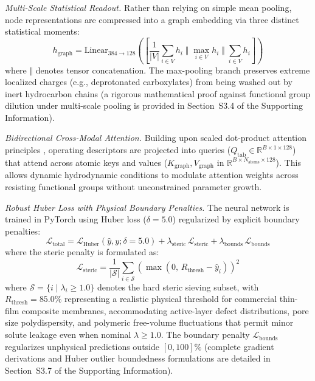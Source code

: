 \documentclass[11pt]{article}
\begin{document}
\textit{Multi-Scale Statistical Readout.} Rather than relying on simple mean pooling, node representations are compressed into a graph embedding via three distinct statistical moments:
\begin{equation}
h_{\mathrm{graph}} = \mathrm{Linear}_{384 \to 128} \left( \left[ \frac{1}{|V|}\sum_{i \in V} h_i \; \Big\Vert \; \max_{i \in V} h_i \; \Big\Vert \; \sum_{i \in V} h_i \right] \right)
\label{eq:readout}
\end{equation}
where $\Vert$ denotes tensor concatenation. The max-pooling branch preserves extreme localized charges (e.g., deprotonated carboxylates) from being washed out by inert hydrocarbon chains (a rigorous mathematical proof against functional group dilution under multi-scale pooling is provided in Section~S3.4 of the Supporting Information).

\textit{Bidirectional Cross-Modal Attention.} Building upon scaled dot-product attention principles \cite{vaswani2017}, operating descriptors are projected into queries ($Q_{\mathrm{tab}} \in \mathbb{R}^{B \times 1 \times 128}$) that attend across atomic keys and values ($K_{\mathrm{graph}}, V_{\mathrm{graph}}$ in $\mathbb{R}^{B \times N_{\mathrm{atoms}} \times 128}$). This allows dynamic hydrodynamic conditions to modulate attention weights across resisting functional groups without unconstrained parameter growth.

\textit{Robust Huber Loss with Physical Boundary Penalties.} The neural network is trained in PyTorch \cite{paszke2019} using Huber loss ($\delta = 5.0$) regularized by explicit boundary penalties:
\begin{equation}
\mathcal{L}_{\mathrm{total}} = \mathcal{L}_{\mathrm{Huber}}(\hat{y}, y; \delta = 5.0) + \lambda_{\mathrm{steric}}\,\mathcal{L}_{\mathrm{steric}} + \lambda_{\mathrm{bounds}}\,\mathcal{L}_{\mathrm{bounds}}
\label{eq:loss}
\end{equation}
where the steric penalty is formulated as:
\begin{equation}
\mathcal{L}_{\mathrm{steric}} = \frac{1}{|\mathcal{S}|} \sum_{i \in \mathcal{S}} \left( \max\left(0,\, R_{\mathrm{thresh}} - \hat{y}_i\right) \right)^2
\label{eq:steric_loss}
\end{equation}
where $\mathcal{S} = \{i \mid \lambda_i \ge 1.0\}$ denotes the hard steric sieving subset, with $R_{\mathrm{thresh}} = 85.0\%$ representing a realistic physical threshold for commercial thin-film composite membranes, accommodating active-layer defect distributions, pore size polydispersity, and polymeric free-volume fluctuations that permit minor solute leakage even when nominal $\lambda \ge 1.0$. The boundary penalty $\mathcal{L}_{\mathrm{bounds}}$ regularizes unphysical predictions outside $[0, 100]\%$ (complete gradient derivations and Huber outlier boundedness formulations are detailed in Section~S3.7 of the Supporting Information).
\end{document}
